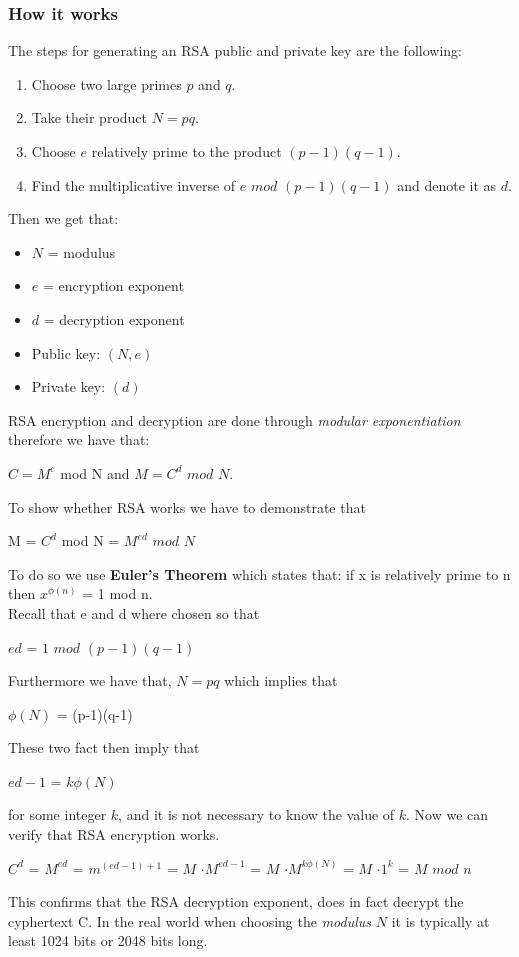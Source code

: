 \documentclass[a4paper]{article}
\begin{document}
\subsubsection{How it works}
The steps for generating an RSA public and private key are the following:
\begin{enumerate}
    \item Choose two large primes $p$ and $q$.
    \item Take their product $N = pq$.
    \item Choose $e$ relatively prime to the product $(p-1)(q-1)$.
    \item Find the multiplicative inverse of $e$ $mod$ $(p-1)(q-1)$ and denote it as $d$.
\end{enumerate}
Then we get that:
\begin{itemize}
    \item $N$ = modulus
    \item $e$ = encryption exponent
    \item $d$ = decryption exponent
    \item Public key: $(N,e)$
    \item Private key: $(d)$
\end{itemize}
RSA encryption and decryption are done through \textit{modular exponentiation} therefore we have that:
\begin{center}
$C = M^e$ mod N and $M = C^d$ $mod$ $N$.
\end{center}{}
To show whether RSA works we have to demonstrate that
\begin{center}
    M = $C^d$ mod N = $M^{ed}$ $mod$ $N$
\end{center}{}
To do so we use \textbf{Euler's Theorem} which states that: if x is relatively prime to n then $x^{\phi(n)}$ = 1 mod n.\\
Recall that e and d where chosen so that 
\begin{center}
$ed$ = $1$ $mod$ $(p-1)(q-1)$
\end{center}
Furthermore we have that, $N = pq$ which implies that
\begin{center}
    $\phi(N)$ = (p-1)(q-1)
\end{center}
These two fact then imply that
\begin{center}
    $ed - 1$ = $k\phi(N)$
\end{center}
for some integer $k$, and it is not necessary to know the value of $k$. Now we can verify that RSA encryption works.
\begin{center}
    $C^d$ = $M^{ed}$ = $m^{(ed-1) + 1}$ = $M$ $\cdot M^{ed-1}$ = $M$ $\cdot M^{k\phi(N)}$ = $M$ $\cdot 1^k$ = $M$ $mod$ $n$
\end{center}
This confirms that the RSA decryption exponent, does in fact decrypt the cyphertext C.
In the real world when choosing the \textit{modulus} $N$ it is typically at least 1024 bits or 2048 bits long.
\end{document}
